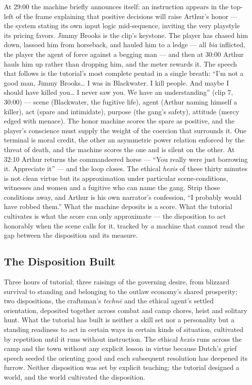 \documentclass{article}
\begin{document}
At 29:00 the machine briefly announces itself: an instruction appears in the top-left of the frame explaining that positive decisions will raise Arthur's honor — the system stating its own input logic mid-sequence, inviting the very playstyle its pricing favors. Jimmy Brooks is the clip's keystone. The player has chased him down, lassoed him from horseback, and hauled him to a ledge — all \textit{bia} inflicted, the player the agent of force against a begging man — and then at 30:00 Arthur hauls him up rather than dropping him, and the meter rewards it. The speech that follows is the tutorial's most complete pentad in a single breath: ``I'm not a good man, Jimmy Brooks… I was in Blackwater. I kill people. And maybe I should have killed you… I never saw you. We have an understanding'' (clip 7, 30:00) — scene (Blackwater, the fugitive life), agent (Arthur naming himself a killer), act (spare and intimidate), purpose (the gang's safety), attitude (mercy edged with menace). The honor machine scores the spare as positive, and the player's conscience must supply the weight of the coercion that surrounds it. One terminal is moral credit, the other an asymmetric power relation enforced by the threat of death, and the machine scores the one and is silent on the other. At 32:10 Arthur returns the commandeered horse — ``You really were just borrowing it. Appreciate it'' — and the loop closes. The ethical \textit{hexis} of these thirty minutes is not clean virtue but its approximation under particular scene-conditions, witnesses and women and a fugitive who can name the gang. Strip those conditions away, and Arthur is his own narrator's confession, ``I probably would have robbed them.'' What the machine deposits is a score. What the tutorial cultivates is what the score can only approximate — the disposition to act honorably when the scene calls for it, tracked by a machine that cannot read the gap between the disposition and its measure.

\bigskip

\subsection*{The Disposition Built}

Three hours of tutorial; three raisings of the governing desire, from blizzard survival to standing and belonging to the outlaw economy's shared prosperity; two dispositions, the craftsman's \textit{technē} and the ethical agent's settled orientation, deposited together across combat and camp chores, heist and solitary hunt. What the tutorial has built is neither a skill set nor a personality but a standing readiness to act in certain ways in certain kinds of situation, cultivated by repetition until it runs without instruction. The ethical \textit{hexis} runs across the camp and the town without any explicit lesson in virtue because Dutch's grief speech seeded the orienting good and each subsequent resolution has deepened its furrow. Neither disposition was set by explicit teaching; the tutorial designed a world, and the world cultivated the disposition.
\end{document}
